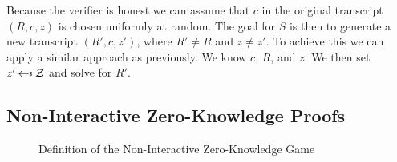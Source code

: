 Because the verifier is honest we can assume that $c$ in the original transcript $(R,c,z)$ is chosen uniformly at random.
The goal for $S$ is then to generate a new transcript $(R', c, z')$, where $R' \neq R$ and $z \neq z'$.
To achieve this we can apply a similar approach as previously. We know $c$, $R$, and $z$. We then set $z' \getsr \calZ$ and solve for $R'$.

\subsection{Non-Interactive Zero-Knowledge Proofs}
\begin{figure}
\centering


\caption{Definition of the Non-Interactive Zero-Knowledge Game}
    \label{fig:nizk}
\end{figure}

